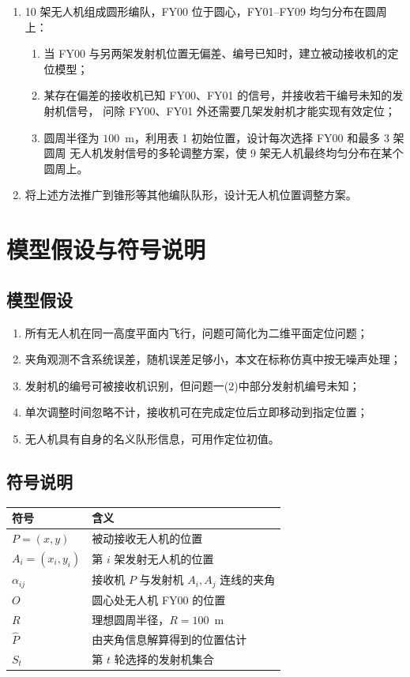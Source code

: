 \documentclass[UTF8,a4paper,11pt]{ctexart}
\begin{document}
\begin{enumerate}
  \item 10 架无人机组成圆形编队，FY00 位于圆心，FY01--FY09 均匀分布在圆周上：
  \begin{enumerate}
    \item 当 FY00 与另两架发射机位置无偏差、编号已知时，建立被动接收机的定位模型；
    \item 某存在偏差的接收机已知 FY00、FY01 的信号，并接收若干编号未知的发射机信号，
    问除 FY00、FY01 外还需要几架发射机才能实现有效定位；
    \item 圆周半径为 $100$~m，利用表 1 初始位置，设计每次选择 FY00 和最多 3 架圆周
    无人机发射信号的多轮调整方案，使 9 架无人机最终均匀分布在某个圆周上。
  \end{enumerate}
  \item 将上述方法推广到锥形等其他编队队形，设计无人机位置调整方案。
\end{enumerate}

\section{模型假设与符号说明}

\subsection{模型假设}
\begin{enumerate}
  \item 所有无人机在同一高度平面内飞行，问题可简化为二维平面定位问题；
  \item 夹角观测不含系统误差，随机误差足够小，本文在标称仿真中按无噪声处理；
  \item 发射机的编号可被接收机识别，但问题一(2)中部分发射机编号未知；
  \item 单次调整时间忽略不计，接收机可在完成定位后立即移动到指定位置；
  \item 无人机具有自身的名义队形信息，可用作定位初值。
\end{enumerate}

\subsection{符号说明}
\begin{center}
\begin{tabular}{ll}
\toprule
符号 & 含义 \\
\midrule
$P=(x,y)$ & 被动接收无人机的位置 \\
$A_i=(x_i,y_i)$ & 第 $i$ 架发射无人机的位置 \\
$\alpha_{ij}$ & 接收机 $P$ 与发射机 $A_i,A_j$ 连线的夹角 \\
$O$ & 圆心处无人机 FY00 的位置 \\
$R$ & 理想圆周半径，$R=100$~m \\
$\hat P$ & 由夹角信息解算得到的位置估计 \\
$S_t$ & 第 $t$ 轮选择的发射机集合 \\
\bottomrule
\end{tabular}
\end{center}
\end{document}
